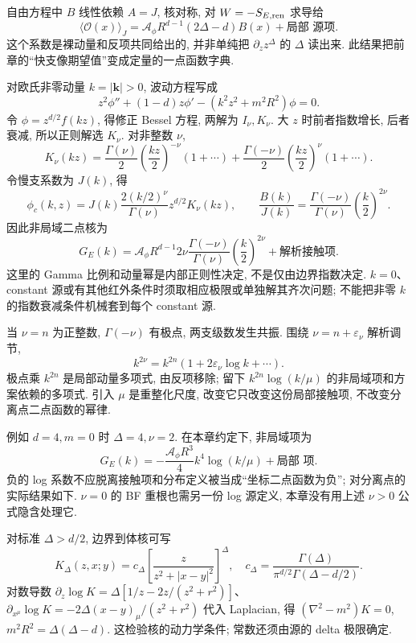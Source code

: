 自由方程中 $B$ 线性依赖 $A=J$, 核对称, 对 $W=-S_{E,\rm ren}$ 求导给
\[
\langle\mathcal O(x)\rangle_J
=\mathcal A_\phi R^{d-1}(2\Delta-d)B(x)
+\text{局部 源项}.
\]
这个系数是裸动量和反项共同给出的, 并非单纯把 $\partial_z z^\Delta$ 的 $\Delta$ 读出来. 此结果把前章的“快支像期望值”变成定量的一点函数字典.

对欧氏非零动量 $k=|\mathbf k|>0$, 波动方程写成
\[
z^2\phi''+(1-d)z\phi'-(k^2z^2+m^2R^2)\phi=0.
\]
令 $\phi=z^{d/2}f(kz)$, 得修正 Bessel 方程, 两解为 $I_\nu,K_\nu$. 大 $z$ 时前者指数增长, 后者衰减, 所以正则解选 $K_\nu$. 对非整数 $\nu$,
\[
K_\nu(kz)=\frac{\Gamma(\nu)}2
\left(\frac{kz}2\right)^{-\nu}(1+\cdots)
+\frac{\Gamma(-\nu)}2
\left(\frac{kz}2\right)^\nu(1+\cdots).
\]
令慢支系数为 $J(k)$, 得
\[
\phi_c(k,z)=J(k)\frac{2(k/2)^\nu}{\Gamma(\nu)}
z^{d/2}K_\nu(kz),
\qquad
\frac{B(k)}{J(k)}=\frac{\Gamma(-\nu)}{\Gamma(\nu)}
\left(\frac k2\right)^{2\nu}.
\]
因此非局域二点核为
\[
G_E(k)=\mathcal A_\phi R^{d-1}2\nu
\frac{\Gamma(-\nu)}{\Gamma(\nu)}
\left(\frac k2\right)^{2\nu}
+\text{解析接触项}.
\]
这里的 Gamma 比例和动量幂是内部正则性决定, 不是仅由边界指数决定. $k=0$、constant 源或有其他红外条件时须取相应极限或单独解其齐次问题; 不能把非零 $k$ 的指数衰减条件机械套到每个 constant 源.

当 $\nu=n$ 为正整数, $\Gamma(-\nu)$ 有极点, 两支级数发生共振. 围绕 $\nu=n+\varepsilon_\nu$ 解析调节,
\[
k^{2\nu}=k^{2n}(1+2\varepsilon_\nu\log k+\cdots).
\]
极点乘 $k^{2n}$ 是局部动量多项式, 由反项移除; 留下 $k^{2n}\log(k/\mu)$ 的非局域项和方案依赖的多项式. 引入 $\mu$ 是重整化尺度, 改变它只改变这份局部接触项, 不改变分离点二点函数的幂律.

例如 $d=4,m=0$ 时 $\Delta=4,\nu=2$. 在本章约定下, 非局域项为
\[
G_E(k)=-\frac{\mathcal A_\phi R^3}{4}
k^4\log(k/\mu)+\text{局部 项}.
\]
负的 log 系数不应脱离接触项和分布定义被当成“坐标二点函数为负”; 对分离点的实际结果如下. $\nu=0$ 的 BF 重根也需另一份 log 源定义, 本章没有用上述 $\nu>0$ 公式隐含处理它.

对标准 $\Delta>d/2$, 边界到体核可写
\begin{equation}\label{eq:K}
K_\Delta(z,x;y)=c_\Delta
\left[\frac z{z^2+|x-y|^2}\right]^\Delta,
\quad
c_\Delta=\frac{\Gamma(\Delta)}{\pi^{d/2}\Gamma(\Delta-d/2)}.
\end{equation}
对数导数 $\partial_z\log K=\Delta[1/z-2z/(z^2+r^2)]$、$\partial_{x^\mu}\log K=-2\Delta(x-y)_\mu/(z^2+r^2)$ 代入 Laplacian, 得 $(\nabla^2-m^2)K=0$, $m^2R^2=\Delta(\Delta-d)$. 这检验核的动力学条件; 常数还须由源的 delta 极限确定.

